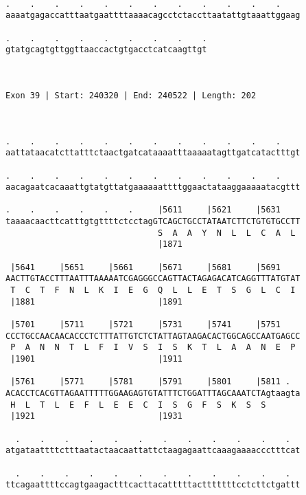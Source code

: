 \documentclass{article}
\begin{document}
\begin{Verbatim}
  
.    .    .    .    .    .    .    .    .    .    .    .    
aaaatgagaccatttaatgaattttaaaacagcctctaccttaatattgtaaattggaag
                                                            
.    .    .    .    .    .    .    .    .
gtatgcagtgttggttaaccactgtgacctcatcaagttgt
                                         
                                         
 
Exon 39 | Start: 240320 | End: 240522 | Length: 202



.    .    .    .    .    .    .    .    .    .    .    .    
aattataacatcttatttctaactgatcataaaatttaaaaatagttgatcatactttgt
                                                            
.    .    .    .    .    .    .    .    .    .    .    .    
aacagaatcacaaattgtatgttatgaaaaaattttggaactataaggaaaaatacgttt
                                                            
.    .    .    .    .    .     |5611     |5621     |5631    
taaaacaacttcatttgtgttttctcctagGTCAGCTGCCTATAATCTTCTGTGTGCCTT
                               S  A  A  Y  N  L  L  C  A  L 
                               |1871                        
  
 |5641     |5651     |5661     |5671     |5681     |5691    
AACTTGTACCTTTAATTTAAAAATCGAGGGCCAGTTACTAGAGACATCAGGTTTATGTAT
 T  C  T  F  N  L  K  I  E  G  Q  L  L  E  T  S  G  L  C  I 
 |1881                         |1891                        
  
 |5701     |5711     |5721     |5731     |5741     |5751    
CCCTGCCAACAACACCCTCTTTATTGTCTCTATTAGTAAGACACTGGCAGCCAATGAGCC
 P  A  N  N  T  L  F  I  V  S  I  S  K  T  L  A  A  N  E  P 
 |1901                         |1911                        
  
 |5761     |5771     |5781     |5791     |5801     |5811 .  
ACACCTCACGTTAGAATTTTTGGAAGAGTGTATTTCTGGATTTAGCAAATCTAgtaagta
 H  L  T  L  E  F  L  E  E  C  I  S  G  F  S  K  S  S       
 |1921                         |1931                        
  
  .    .    .    .    .    .    .    .    .    .    .    .  
atgataattttctttaatactaacaattattctaagagaattcaaagaaaaccctttcat
                                                            
  .    .    .    .    .    .    .    .    .    .    .    .  
ttcagaattttccagtgaagactttcacttacatttttactttttttcctcttctgattt
                                                            

\end{Verbatim}
\end{document}
